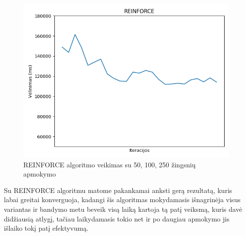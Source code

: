 \documentclass{VUMIFPSbakalaurinis}
\begin{document}
\begin{figure}[H]
\begin{minipage}[b]{0.45\textwidth}
        \includegraphics[width=\textwidth]{img/reinforce_250_2.png}
    \end{minipage}
    \caption{REINFORCE algoritmo veikimas su 50, 100, 250 žingsnių apmokymo}
\end{figure}
Su REINFORCE algoritmu matome pakankamai anksti gerą rezultatą, kuris labai greitai konverguoja, kadangi šis algoritmas mokydamasis išnagrinėja visus variantas ir bandymo metu beveik visą laiką kartoja tą patį veiksmą, kuris davė didžiausią atlygį, tačiau laikydamasis tokio net ir po daugiau apmokymo jis išlaiko tokį patį efektyvumą. 
\end{document}
